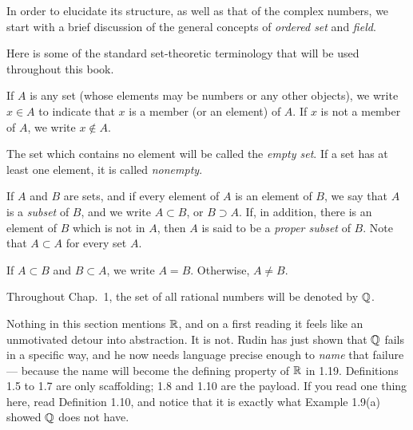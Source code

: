 \documentclass[11pt,twoside]{article}
\begin{document}
In order to elucidate its structure, as well as that of the complex numbers, we
start with a brief discussion of the general concepts of \emph{ordered set} and
\emph{field}.

Here is some of the standard set-theoretic terminology that will be used
throughout this book.

If $A$ is any set (whose elements may be numbers or any other objects), we write
$x \in A$ to indicate that $x$ is a member (or an element) of $A$. If $x$ is not
a member of $A$, we write $x \notin A$.

The set which contains no element will be called the \emph{empty set}. If a set
has at least one element, it is called \emph{nonempty}.

If $A$ and $B$ are sets, and if every element of $A$ is an element of $B$, we
say that $A$ is a \emph{subset} of $B$, and we write $A \subset B$, or
$B \supset A$. If, in addition, there is an element
of $B$ which is not in $A$, then $A$ is said to be a \emph{proper subset} of
$B$. Note that $A \subset A$ for every set $A$.

If $A \subset B$ and $B \subset A$, we write $A = B$. Otherwise, $A \ne B$.

Throughout Chap.\ 1, the set of all rational numbers will be denoted by $\mathbb{Q}$.


\begin{signpost}
Nothing in this section mentions $\mathbb{R}$, and on a first reading it feels like an
unmotivated detour into abstraction. It is not. Rudin has just shown that $\mathbb{Q}$
fails in a specific way, and he now needs language precise enough to \emph{name}
that failure --- because the name will become the defining property of $\mathbb{R}$ in
1.19. Definitions 1.5 to 1.7 are only scaffolding; 1.8 and 1.10 are the payload.
If you read one thing here, read Definition 1.10, and notice that it is exactly
what Example 1.9(a) showed $\mathbb{Q}$ does not have.
\end{signpost}
\end{document}
